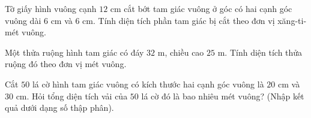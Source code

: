 \begin{ex} %
Tờ giấy hình vuông cạnh $12\text{ cm}$ cắt bớt tam giác vuông ở góc có hai cạnh góc vuông dài $6\text{ cm}$ và $6\text{ cm}$. Tính diện tích phần tam giác bị cắt theo đơn vị xăng-ti-mét vuông.
\end{ex}

\begin{ex} %
Một thửa ruộng hình tam giác có đáy $32\text{ m}$, chiều cao $25\text{ m}$. Tính diện tích thửa ruộng đó theo đơn vị mét vuông.
\end{ex}

\begin{ex} %
Cắt $50$ lá cờ hình tam giác vuông có kích thước hai cạnh góc vuông là $20\text{ cm}$ và $30\text{ cm}$. Hỏi tổng diện tích vải của $50$ lá cờ đó là bao nhiêu mét vuông? (Nhập kết quả dưới dạng số thập phân).
\end{ex}
